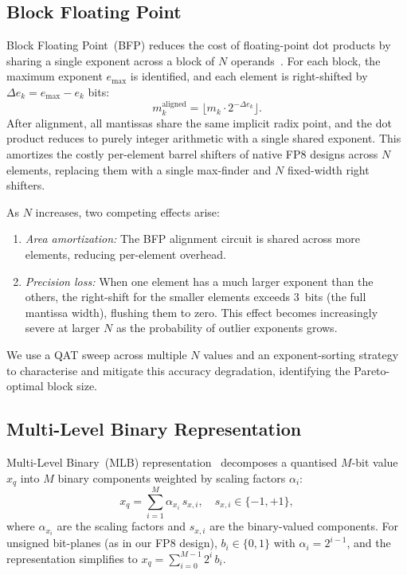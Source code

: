 \documentclass[conference]{IEEEtran}
\begin{document}
\subsection{Block Floating Point}
\label{ssec:bfp}

Block Floating Point~(BFP) reduces the cost of floating-point dot
products by sharing a single exponent across a block of $N$
operands~\cite{b3}.  For each block, the maximum exponent
$e_{\max}$ is identified, and each element is right-shifted by
$\Delta e_k = e_{\max} - e_k$ bits:
\begin{equation}
    m_k^{\text{aligned}} = \lfloor m_k \cdot 2^{-\Delta e_k} \rfloor.
    \label{eq:bfp_align}
\end{equation}
After alignment, all mantissas share the same implicit radix point,
and the dot product reduces to purely integer arithmetic with a
single shared exponent.  This amortizes the costly per-element
barrel shifters of native FP8 designs across $N$ elements, replacing
them with a single max-finder and $N$ fixed-width right shifters.

As $N$ increases, two competing effects arise:
\begin{enumerate}
    \item \textit{Area amortization:} The BFP alignment circuit is
    shared across more elements, reducing per-element overhead.
    \item \textit{Precision loss:} When one element has a much
    larger exponent than the others, the right-shift for the smaller
    elements exceeds 3~bits (the full mantissa width), flushing them
    to zero.  This effect becomes increasingly severe at larger $N$
    as the probability of outlier exponents grows.
\end{enumerate}
We use a QAT sweep across multiple $N$ values and an
exponent-sorting strategy to characterise and mitigate this
accuracy degradation, identifying the Pareto-optimal block size.

\subsection{Multi-Level Binary Representation}
\label{ssec:mlb_bg}

Multi-Level Binary~(MLB) representation~\cite{b1} decomposes a
quantised $M$-bit value $x_q$ into $M$ binary components weighted
by scaling factors $\alpha_i$:
\begin{equation}
    x_q = \sum_{i=1}^{M} \alpha_{x_i} \, s_{x,i},
    \quad s_{x,i} \in \{-1,+1\},
    \label{eq:mlb_repr}
\end{equation}
where $\alpha_{x_i}$ are the scaling factors and $s_{x,i}$ are
the binary-valued components.  For unsigned bit-planes (as in our
FP8 design), $b_i \in \{0,1\}$ with $\alpha_i = 2^{i-1}$, and the
representation simplifies to
$x_q = \sum_{i=0}^{M-1} 2^i \, b_i$.
\end{document}
